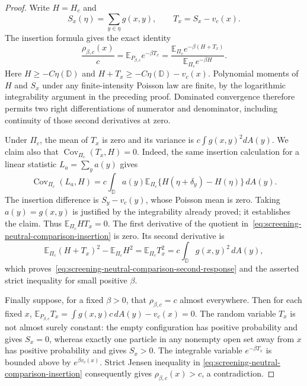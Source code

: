 \documentclass[11pt,a4paper]{article}
\numberwithin{equation}{section}
\theoremstyle{definition}
\theoremstyle{remark}
\newcommand{\D}{\mathbb D}
\begin{document}
\begin{proof}
Write $H=H_c$ and
\[
 S_x(\eta)=\sum_{y\in\eta}g(x,y),\qquad T_x=S_x-v_c(x).
\]
The insertion formula gives the exact identity
\begin{equation}
 \frac{\rho_{\beta,c}(x)}c
 =\mathbb E_{P_{\beta,c}}e^{-\beta T_x}
 =\frac{\mathbb E_{\Pi_c}e^{-\beta(H+T_x)}}
        {\mathbb E_{\Pi_c}e^{-\beta H}}.
 \label{eq:screening-neutral-comparison-insertion}
\end{equation}
Here $H\ge-C\eta(\D)$ and
$H+T_x\ge-C\eta(\D)-v_c(x)$.  Polynomial moments of $H$ and $S_x$
under any finite-intensity Poisson law are finite, by the logarithmic
integrability argument in the preceding proof.  Dominated
convergence therefore permits two right differentiations of numerator
and denominator, including continuity of those second derivatives at
zero.

Under $\Pi_c$, the mean of $T_x$ is zero and its variance is
$c\int g(x,y)^2dA(y)$.  We claim also that
$\operatorname{Cov}_{\Pi_c}(T_x,H)=0$.  Indeed, the same insertion
calculation for a linear statistic $L_a=\sum_y a(y)$ gives
\[
 \operatorname{Cov}_{\Pi_c}(L_a,H)
 =c\int_\D a(y)\mathbb E_{\Pi_c}\{H(\eta+\delta_y)-H(\eta)\}
       \,dA(y).
\]
The insertion difference is $S_y-v_c(y)$, whose Poisson mean is zero.
Taking $a(y)=g(x,y)$ is justified by the integrability already proved;
it establishes the claim.  Thus $\mathbb E_{\Pi_c}HT_x=0$.
The first derivative of the quotient
in~\eqref{eq:screening-neutral-comparison-insertion} is zero.  Its
second derivative is
\[
 \mathbb E_{\Pi_c}(H+T_x)^2-\mathbb E_{\Pi_c}H^2
 =\mathbb E_{\Pi_c}T_x^2
 =c\int_\D g(x,y)^2\,dA(y),
\]
which proves~\eqref{eq:screening-neutral-comparison-second-response}
and the asserted strict inequality for small positive $\beta$.

Finally suppose, for a fixed $\beta>0$, that $\rho_{\beta,c}=c$
almost everywhere.  Then for each fixed $x$,
$\mathbb E_{P_{\beta,c}}T_x=\int g(x,y)c\,dA(y)-v_c(x)=0$.
The random variable $T_x$ is not almost surely constant: the empty
configuration has positive probability and gives $S_x=0$, whereas
exactly one particle in any nonempty open set away from $x$ has
positive probability and gives $S_x>0$.  The integrable variable
$e^{-\beta T_x}$ is bounded above by $e^{\beta v_c(x)}$.
Strict Jensen inequality in
\eqref{eq:screening-neutral-comparison-insertion} consequently gives
$\rho_{\beta,c}(x)>c$, a contradiction.
\end{proof}
\end{document}
